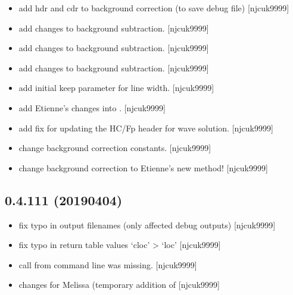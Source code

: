 \documentclass[a4paper,10pt,english]{report}
\begin{document}
\begin{itemize}
\item {} 
 \sphinxhyphen{} add hdr and cdr to background correction (to
save debug file) {[}njcuk9999{]}

\item {} 
 \sphinxhyphen{} add changes to background subtraction.
{[}njcuk9999{]}

\item {} 
 \sphinxhyphen{} add changes to background subtraction.
{[}njcuk9999{]}

\item {} 
 \sphinxhyphen{} add changes to background subtraction.
{[}njcuk9999{]}

\item {} 
 \sphinxhyphen{} add initial keep parameter for line width. {[}njcuk9999{]}

\item {} 
 \sphinxhyphen{} add Etienne’s changes into
. {[}njcuk9999{]}

\item {} 
 \sphinxhyphen{} add fix for updating the HC/Fp header
for wave solution. {[}njcuk9999{]}

\item {} 
 \sphinxhyphen{} change background correction constants.
{[}njcuk9999{]}

\item {} 
 \sphinxhyphen{} change background correction to Etienne’s
new method! {[}njcuk9999{]}

\end{itemize}


\subsection{0.4.111 (2019\sphinxhyphen{}04\sphinxhyphen{}04)}
\label{\detokenize{misc/changelog:id169}}\begin{itemize}
\item {} 
 \sphinxhyphen{} fix typo in output filenames (only affected
debug outputs) {[}njcuk9999{]}

\item {} 
 \sphinxhyphen{} fix typo in return table values ‘cloc’ \textendash{}\textgreater{} ‘loc’
{[}njcuk9999{]}

\item {} 
 \sphinxhyphen{} call from command line was missing. {[}njcuk9999{]}

\item {} 
 changes for Melissa (temporary addition of
 {[}njcuk9999{]}

\end{itemize}
\end{document}
